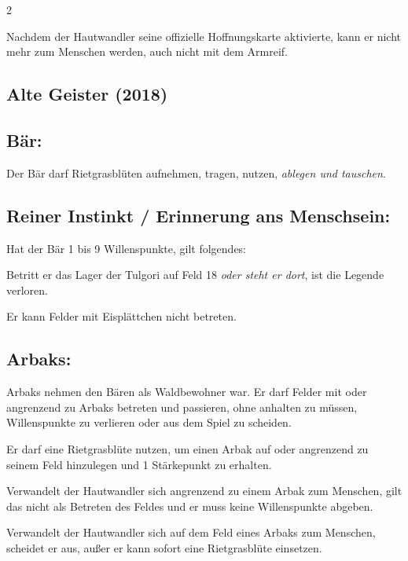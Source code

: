 \documentclass[10pt, a4paper, oneside]{book}
\newcommand{\fan}[1]{\textit{#1}}
\begin{document}
\begin{multicols*}{2}
\begin{bgcolor}
Nachdem der Hautwandler seine offizielle Hoffnungskarte aktivierte, kann er nicht mehr zum Menschen werden, auch nicht mit dem Armreif.
\supercite{92358}

\end{bgcolor}



\columnbreak




\begin{bgcolor}[color-AG]
\section{Alte Geister (2018)}

\subsection{Bär:}

Der Bär darf Rietgrasblüten aufnehmen, tragen, nutzen, \fan{ablegen und tauschen}. 
\supercite{AG:Begleitheft}


\subsection{Reiner Instinkt / Erinnerung ans Menschsein:}

Hat der Bär 1 bis 9 Willenspunkte, gilt folgendes:

\bullet{} Betritt er das Lager der Tulgori auf Feld 18 \fan{oder steht er dort}, ist die Legende verloren.
\supercite{AG:Begleitheft}

\bullet{} Er kann Felder mit Eisplättchen nicht betreten.
\supercite{AG:Begleitheft}


\subsection{Arbaks:}

Arbaks nehmen den Bären als Waldbewohner war. Er darf Felder mit oder angrenzend zu Arbaks betreten und passieren, ohne anhalten zu müssen, Willenspunkte zu verlieren oder aus dem Spiel zu scheiden. 

Er darf eine Rietgrasblüte nutzen, um einen Arbak auf oder angrenzend zu seinem Feld hinzulegen und 1 Stärkepunkt zu erhalten.

Verwandelt der Hautwandler sich angrenzend zu einem Arbak zum Menschen, gilt das nicht als Betreten des Feldes und er muss keine Willenspunkte abgeben.

Verwandelt der Hautwandler sich auf dem Feld eines Arbaks zum Menschen, scheidet er aus, außer er kann sofort eine Rietgrasblüte einsetzen.
\supercite{AG:Begleitheft}


\end{bgcolor}
\end{multicols*}
\end{document}
